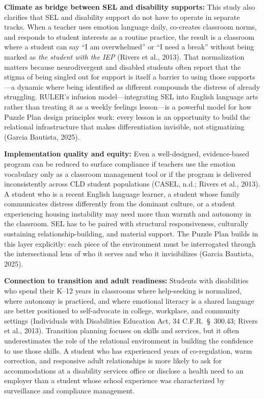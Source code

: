 \documentclass[11pt]{article}
\begin{document}
\textbf{Climate as bridge between SEL and disability supports:} This study also clarifies that SEL and disability support do not have to operate in separate tracks. When a teacher uses emotion language daily, co-creates classroom norms, and responds to student interests as a routine practice, the result is a classroom where a student can say ``I am overwhelmed'' or ``I need a break'' without being marked as \textit{the student with the IEP} (Rivers et al., 2013). That normalization matters because neurodivergent and disabled students often report that the stigma of being singled out for support is itself a barrier to using those supports---a dynamic where being identified as different compounds the distress of already struggling. RULER's infusion model---integrating SEL into English language arts rather than treating it as a weekly feelings lesson---is a powerful model for how Puzzle Plan design principles work: every lesson is an opportunity to build the relational infrastructure that makes differentiation invisible, not stigmatizing (Garcia Bautista, 2025).

\textbf{Implementation quality and equity:} Even a well-designed, evidence-based program can be reduced to surface compliance if teachers use the emotion vocabulary only as a classroom management tool or if the program is delivered inconsistently across CLD student populations (CASEL, n.d.; Rivers et al., 2013). A student who is a recent English language learner, a student whose family communicates distress differently from the dominant culture, or a student experiencing housing instability may need more than warmth and autonomy in the classroom. SEL has to be paired with structural responsiveness, culturally sustaining relationship-building, and material support. The Puzzle Plan builds in this layer explicitly: each piece of the environment must be interrogated through the intersectional lens of who it serves and who it invisibilizes (Garcia Bautista, 2025).

\textbf{Connection to transition and adult readiness:} Students with disabilities who spend their K--12 years in classrooms where help-seeking is normalized, where autonomy is practiced, and where emotional literacy is a shared language are better positioned to self-advocate in college, workplace, and community settings (Individuals with Disabilities Education Act, 34 C.F.R.\ \S\ 300.43; Rivers et al., 2013). Transition planning focuses on skills and services, but it often underestimates the role of the relational environment in building the confidence to use those skills. A student who has experienced years of co-regulation, warm correction, and responsive adult relationships is more likely to ask for accommodations at a disability services office or disclose a health need to an employer than a student whose school experience was characterized by surveillance and compliance management.
\end{document}
